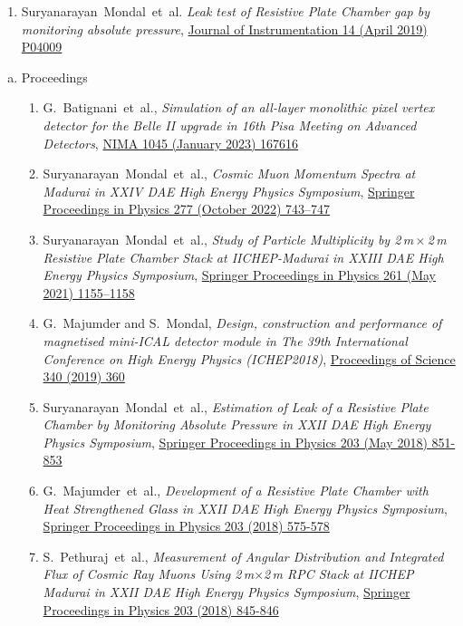 \documentclass[12pt]{article}
\begin{document}
\begin{justify}
\begin{enumerate}[a.]
\begin{enumerate}[1.]
  \item Suryanarayan~Mondal~et~al. \emph{Leak test of Resistive Plate Chamber gap by monitoring absolute pressure}, \href{https://doi.org/10.1088/1748-0221/14/04/P04009}{Journal of Instrumentation 14 (April 2019) P04009}
  \end{enumerate} 
\end{enumerate} 
\begin{enumerate}[b.]
\item Proceedings
  \begin{enumerate}[1.]
  \item G.~Batignani~et~al., \emph{Simulation of an all-layer monolithic pixel vertex detector for the Belle II upgrade in 16th Pisa Meeting on Advanced Detectors}, \href{https://doi.org/10.1016/j.nima.2022.167616}{NIMA 1045 (January 2023) 167616}
  \item Suryanarayan~Mondal~et~al., \emph{Cosmic Muon Momentum Spectra at Madurai in XXIV DAE High Energy Physics Symposium}, \href{https://doi.org/10.1007/978-981-19-2354-8_134}{Springer Proceedings in Physics 277 (October 2022) 743--747}
  \item Suryanarayan~Mondal~et~al., \emph{Study of Particle Multiplicity by 2\,m\,$\times$\,2\,m Resistive Plate Chamber Stack at IICHEP-Madurai in XXIII DAE High Energy Physics Symposium}, \href{https://doi.org/10.1007/978-981-33-4408-2_172}{Springer Proceedings in Physics 261 (May 2021) 1155--1158}
  \item G.~Majumder and S.~Mondal, \emph{Design, construction and performance of magnetised mini-ICAL detector module in The 39th International Conference on High Energy Physics (ICHEP2018)}, \href{https://doi.org/10.22323/1.340.0360}{Proceedings of Science 340 (2019) 360}
  \item Suryanarayan~Mondal~et~al., \emph{Estimation of Leak of a Resistive Plate Chamber by Monitoring Absolute Pressure in XXII DAE High Energy Physics Symposium}, \href{https://doi.org/10.1007/978-3-319-73171-1_207}{Springer Proceedings in Physics 203 (May 2018) 851-853}
  \item G.~Majumder~et~al., \emph{Development of a Resistive Plate Chamber with Heat Strengthened Glass in XXII DAE High Energy Physics Symposium}, \href{https://doi.org/10.1007/978-3-319-73171-1_135}{Springer Proceedings in Physics 203 (2018) 575-578}
  \item S.~Pethuraj~et~al., \emph{Measurement of Angular Distribution and Integrated Flux of Cosmic Ray Muons Using 2\,m$\times$2\,m RPC Stack at IICHEP Madurai in XXII DAE High Energy Physics Symposium}, \href{https://doi.org/10.1007/978-3-319-73171-1_205}{Springer Proceedings in Physics 203 (2018) 845-846}

\end{enumerate}
\end{enumerate}
\end{justify}
\end{document}

